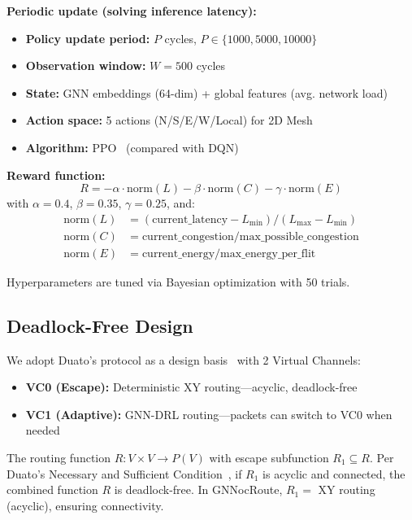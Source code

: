 \documentclass[conference]{IEEEtran}
\begin{document}
\textbf{Periodic update (solving inference latency):}
\begin{itemize}
 \item \textbf{Policy update period:} $P$ cycles, $P\in\{1000,5000,10000\}$
 \item \textbf{Observation window:} $W=500$ cycles
 \item \textbf{State:} GNN embeddings (64-dim) + global features (avg. network load)
 \item \textbf{Action space:} 5 actions (N/S/E/W/Local) for 2D Mesh
 \item \textbf{Algorithm:} PPO~\cite{ppo2017} (compared with DQN)
\end{itemize}

\textbf{Reward function:}
\begin{equation}
R = -\alpha\cdot\text{norm}(L) - \beta\cdot\text{norm}(C) - \gamma\cdot\text{norm}(E)
\label{eq:reward}
\end{equation}
with $\alpha=0.4$, $\beta=0.35$, $\gamma=0.25$, and:
\begin{align}
\text{norm}(L) &= (\text{current\_latency} - L_{\min})/(L_{\max} - L_{\min}) \nonumber\\
\text{norm}(C) &= \text{current\_congestion} / \text{max\_possible\_congestion} \nonumber\\
\text{norm}(E) &= \text{current\_energy} / \text{max\_energy\_per\_flit} \nonumber
\end{align}

Hyperparameters are tuned via Bayesian optimization with 50 trials.

\subsection{Deadlock-Free Design}
\label{sec:deadlock}

We adopt Duato's protocol as a design basis~\cite{duato1996} with 2 Virtual Channels:
\begin{itemize}
 \item \textbf{VC0 (Escape):} Deterministic XY routing---acyclic, deadlock-free
 \item \textbf{VC1 (Adaptive):} GNN-DRL routing---packets can switch to VC0 when needed
\end{itemize}

The routing function $R: V\times V\to P(V)$ with escape subfunction $R_1\subseteq R$. Per Duato's Necessary and Sufficient Condition~\cite{duato1996}, if $R_1$ is acyclic and connected, the combined function $R$ is deadlock-free. In GNNocRoute, $R_1 =$ XY routing (acyclic), ensuring connectivity.
\end{document}
